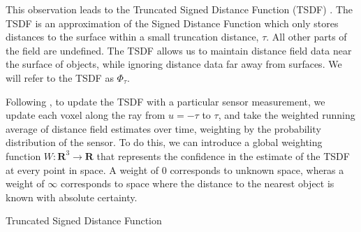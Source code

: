 \documentclass[10pt,twocolumn,letterpaper]{article}
\begin{document}
This observation leads to the Truncated Signed Distance Function (TSDF)
\cite{Curless1996}. The TSDF is an approximation of the  Signed Distance
Function which only stores distances to the surface within a small truncation
distance, $\tau$.  All other parts of the field are undefined. The TSDF allows
us to maintain distance field data near the surface of objects, while ignoring
distance data far away from surfaces. We will refer to the TSDF as
$\Phi_{\tau}$.

Following \cite{Curless1996}, to update the TSDF with a particular sensor
measurement, we update each voxel along the ray from $u = -\tau$ to $\tau$, and
take the weighted running average of distance field estimates over time, weighting by the
probability distribution of the sensor. To do this, we can introduce a global
weighting function $W : \mathbf{R}^3 \to \mathbf{R}$ that represents the
confidence in the estimate of the TSDF at every point in space. A weight of $0$
corresponds to unknown space, wheras a weight of $\infty$ corresponds to space
where the distance to the nearest object is known with absolute certainty.

\begin{algorithm} 
	\caption{Truncated Signed Distance Function}
	\label{alg:TSDF}
	\begin{algorithmic}[1]
				\label{alg:line:dynamic_tsdf}
				    	\label{alg:line:voxel_carve}
					\EndIf
			    \EndFor
					\label{alg:line:tsdf_update}
				\EndFor
			\EndFor
		\EndFor
	\end{algorithmic}
\end{algorithm}
\end{document}

